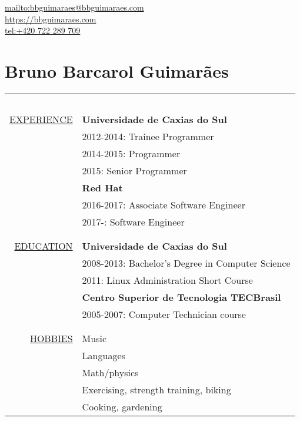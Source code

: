 \begin{flushright}
    \url{mailto:bbguimaraes@bbguimaraes.com} \\
    \url{https://bbguimaraes.com} \\
    \url{tel:+420 722 289 709}
\end{flushright}

\section*{Bruno Barcarol Guimarães}
\bigskip

\begin{center}

\begin{tabular}{rl}
    \multicolumn{2}{c}{~\hspace{.95\textwidth}~} \\
    \hspace{5em}
    \hyperref[sec:professional]{\uppercase{Experience}}
    & \textbf{Universidade de Caxias do Sul} \\
    & 2012-2014: Trainee Programmer \\
    & 2014-2015: Programmer \\
    & 2015: Senior Programmer \\
    & \textbf{Red Hat} \\
    & 2016-2017: Associate Software Engineer \\
    & 2017-: Software Engineer
    \\\\ \hline \\
    \hyperref[sec:education]{\uppercase{Education}}
    & \textbf{Universidade de Caxias do Sul} \\
    & 2008-2013: Bachelor's Degree in Computer Science \\
    & 2011: Linux Administration Short Course \\
    & \textbf{Centro Superior de Tecnologia TECBrasil} \\
    & 2005-2007: Computer Technician course \\
    \\ \hline \\
    \hyperref[sec:etc]{\uppercase{Hobbies}}
    & Music \\
    & Languages \\
    & Math/physics \\
    & Exercising, strength training, biking \\
    & Cooking, gardening
\end{tabular}

\end{center}
